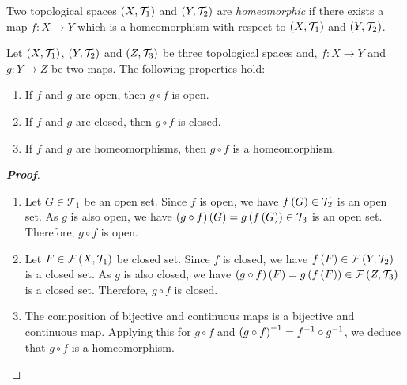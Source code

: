 \begin{definition}
  Two topological spaces $\left(X,\mathcal{T}_1\right)$ and $\left(Y,\mathcal{T}_2\right)$ are \textit{homeomorphic} if there exists a map $f:X\rightarrow Y$ which is a homeomorphism with respect to $\left(X,\mathcal{T}_1\right)$ and $\left(Y,\mathcal{T}_2\right)$.
\end{definition}

\begin{proposition}
  Let $\left(X,\mathcal{T}_1\right)$, $\left(Y,\mathcal{T}_2\right)$ and $\left(Z,\mathcal{T}_3\right)$ be three topological spaces and, $f:X\rightarrow Y$ and $g:Y\rightarrow Z$ be two maps. The following properties hold:

  \begin{enumerate}
    \item If $f$ and $g$ are open, then $g\circ f$ is open.
    \item If $f$ and $g$ are closed, then $g\circ f$ is closed.
    \item If $f$ and $g$ are homeomorphisms, then $g\circ f$ is a homeomorphism.
  \end{enumerate}
  \begin{proof}[\rm\textbf{Proof}]
    \hfill
    \begin{enumerate}
      \item Let $G\in\mathcal{T}_1$ be an open set. Since $f$ is open, we have $f\left(G\right)\in\mathcal{T}_2$ is an open set. As $g$ is also open, we have $\left(g\circ f\right)\left(G\right)=g\left(f\left(G\right)\right)\in\mathcal{T}_3$ is an open set. Therefore, $g\circ f$ is open.
      \item Let $F\in\mathcal{F}\left(X,\mathcal{T}_1\right)$ be closed set. Since $f$ is closed, we have $f\left(F\right)\in\mathcal{F}\left(Y,\mathcal{T}_2\right)$ is a closed set. As $g$ is also closed, we have $\left(g\circ f\right)\left(F\right)=g\left(f\left(F\right)\right)\in\mathcal{F}\left(Z,\mathcal{T}_3\right)$ is a closed set. Therefore, $g\circ f$ is closed.
      \item The composition of bijective and continuous maps is a bijective and continuous map. Applying this for $g\circ f$ and $\left(g\circ f\right)^{-1}=f^{-1}\circ g^{-1}$, we deduce that $g\circ f$ is a homeomorphism.
    \end{enumerate}
  \end{proof}
\end{proposition}

